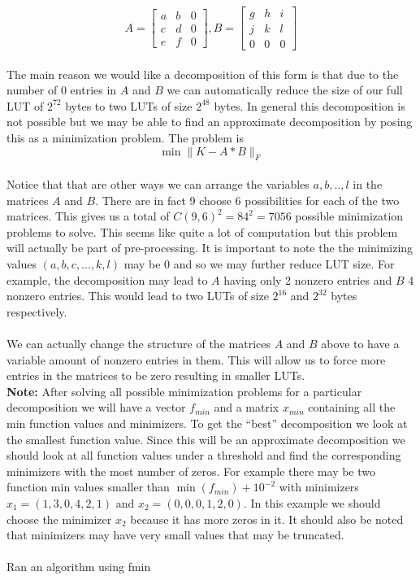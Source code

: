 \documentclass[12pt]{amsart}
\theoremstyle{definition}
\theoremstyle{remark}
\numberwithin{thm}{section}
\begin{document}
$$
A
=
\begin{bmatrix}
a & b & 0\\
c & d & 0\\
e & f & 0
\end{bmatrix}
,
B=
\begin{bmatrix}
g & h & i\\
j & k & l\\
0 & 0 & 0
\end{bmatrix}$$
\\
The main reason we would like a decomposition of this form is that due to the number of 0 entries in $A$ and $B$ we can automatically reduce the size of our full LUT of $2^{72}$ bytes to two LUTs of size $2^{48}$ bytes. In general this decomposition is not possible but we may be able to find an approximate decomposition by posing this as a minimization problem. The problem is 
$$\min \|K-A*B\|_F$$
\\
Notice that that are other ways we can arrange the variables $a,b,..,l$ in the matrices $A$ and $B$. There are in fact 9 choose 6 possibilities for each of the two matrices. This gives us a total of  $C(9,6)^2 =84^2= 7056$ possible minimization problems to solve. This seems like quite a lot of computation but this problem will actually be part of pre-processing. It is important to note the the minimizing values $(a,b,c,...,k,l)$ may be 0 and so we may further reduce LUT size. For example, the decomposition may lead to $A$ having only 2 nonzero entries and $B$ 4 nonzero entries. This would lead to two LUTs of size $2^{16}$ and $2^{32}$ bytes respectively.
\\
\\We can actually change the structure of the matrices $A$ and $B$ above to have a variable amount of nonzero entries in them. This will allow us to force more entries in the matrices to be zero resulting in smaller LUTs. 
\\
\textbf{Note:} After solving all possible minimization problems for a particular decomposition we will have a vector \textit{$f_{min}$} and a matrix \textit{$x_{min}$} containing all the min function values and minimizers. To get the ``best'' decomposition we look at the smallest function value. Since this will be an approximate decomposition we should look at all function values under a threshold and find the corresponding minimizers with the most number of zeros. For example there may be two function min values smaller than $\min(f_{min}) + 10^{-2}$ with minimizers $x_1=(1, 3, 0, 4, 2, 1)$ and $x_2=(0, 0, 0, 1, 2, 0)$. In this example we should choose the minimizer $x_2$ because it has more zeros in it. It should also be noted that minimizers may have very small values that may be truncated. 
\\
\\Ran an algorithm using fmin
\end{document}
